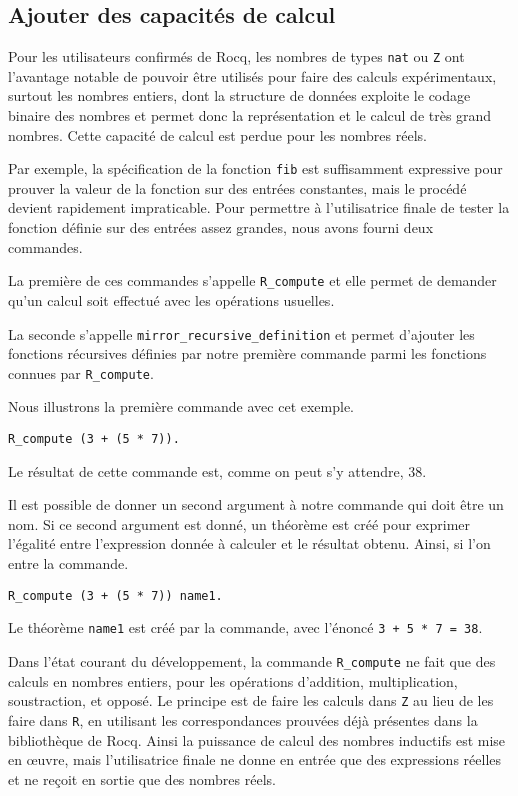 \documentclass{jflart}
\begin{document}
\subsection{Ajouter des capacités de calcul}
Pour les utilisateurs confirmés de Rocq, les nombres de types \texttt{nat} ou
\texttt{Z} ont l'avantage notable de pouvoir être utilisés pour faire des
calculs
expérimentaux, surtout les nombres entiers, dont la structure de données
exploite le codage binaire des nombres et permet donc la représentation
et le calcul de très grand nombres.  Cette capacité de calcul est perdue pour
les nombres réels.

Par exemple, la spécification de la fonction \texttt{fib} est
suffisamment expressive pour prouver la valeur de la fonction sur des
entrées constantes, mais le procédé devient rapidement impraticable.  Pour
permettre à l'utilisatrice finale de tester la fonction définie sur des
entrées assez grandes, nous avons fourni deux commandes.

La première de ces commandes s'appelle \texttt{R\_compute} et elle
permet de demander qu'un calcul soit effectué avec les opérations
usuelles.

La seconde s'appelle \texttt{mirror\_recursive\_definition}
et permet d'ajouter les fonctions récursives définies par notre
première commande parmi les fonctions connues par \texttt{R\_compute}.

Nous illustrons la première commande avec cet exemple.
\begin{verbatim}
R_compute (3 + (5 * 7)).
\end{verbatim}
Le résultat de cette commande est, comme on peut s'y attendre, 38.

Il est possible de donner un second argument à notre commande qui doit
être un nom.  Si ce second argument est donné, un théorème est créé
pour exprimer l'égalité entre l'expression donnée à calculer et le résultat
obtenu.  Ainsi, si l'on entre la
commande.
\begin{verbatim}
R_compute (3 + (5 * 7)) name1.
\end{verbatim}
Le théorème \texttt{name1} est créé par la commande, avec l'énoncé \texttt{3
  + 5 * 7 = 38}.

Dans l'état courant du développement, la commande \texttt{R\_compute}
ne fait que des calculs en nombres entiers, pour les opérations
d'addition, multiplication, soustraction, et opposé.  Le principe est
de faire les calculs dans \texttt{Z} au lieu de les faire dans \texttt{R},
en utilisant les correspondances prouvées déjà présentes dans la
bibliothèque de Rocq.  Ainsi la puissance de calcul des nombres
inductifs est mise en œuvre, mais l'utilisatrice finale ne donne en
entrée que des expressions réelles et ne reçoit en sortie que des
nombres réels.
\end{document}
